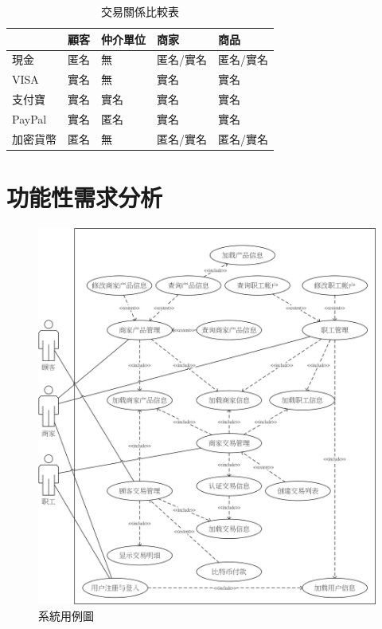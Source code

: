 		\begin{table}[!htbp]
		\centering
		\caption{交易關係比較表}
		\label{txvs}
		\begin{tabular}{|l|l|l|l|l|}
		\hline
		 & 顧客 & 仲介單位 & 商家 & 商品 \\ \hline
		現金 & 匿名 & 無 & 匿名/實名 & 匿名/實名 \\ \hline
		VISA & 實名 & 無 & 實名 & 實名 \\ \hline
		支付寶 & 實名 & 實名 & 實名 & 實名 \\ \hline
		PayPal & 實名 & 匿名 & 實名 & 實名 \\ \hline
		加密貨幣 & 匿名 & 無 & 匿名/實名 & 匿名/實名 \\ \hline
		\end{tabular}
		\end{table}

\section{功能性需求分析}


\begin{figure}[!htbp]
	\centering
	\includegraphics[width = 1\textwidth]{UC.jpg}
	\caption{系統用例圖}\label{UC}
\end{figure}

